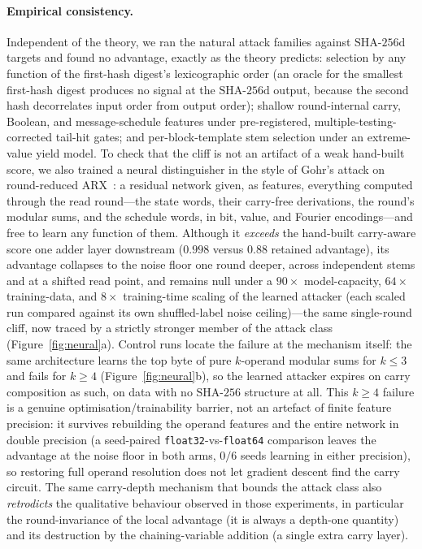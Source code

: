\documentclass[11pt]{article}
\theoremstyle{remark}
\newcommand{\SHA}{\mathrm{SHA\text{-}256}}
\newcommand{\SHAd}{\mathrm{SHA\text{-}256d}}
\begin{document}
\paragraph{Empirical consistency.}
Independent of the theory, we ran the natural attack families against
$\SHAd$ targets and found no advantage, exactly as the theory predicts:
selection by any function of the first-hash digest's lexicographic order
(an oracle for the smallest first-hash digest produces no signal at the
$\SHAd$ output, because the second hash decorrelates input order from
output order); shallow round-internal carry, Boolean, and
message-schedule features under pre-registered, multiple-testing-corrected
tail-hit gates; and per-block-template stem selection under an
extreme-value yield model. To check that the cliff is not an artifact of a
weak hand-built score, we also trained a neural distinguisher in the style
of Gohr's attack on round-reduced ARX~\cite{gohr}: a residual network
given, as features, everything computed through the read round---the state
words, their carry-free derivations, the round's modular sums, and the
schedule words, in bit, value, and Fourier encodings---and free to learn
any function of them. Although it \emph{exceeds} the hand-built carry-aware
score one adder layer downstream ($0.998$ versus $0.88$ retained
advantage), its advantage collapses to the noise floor one round deeper,
across independent stems and at a shifted read point, and remains null
under a $90\times$ model-capacity, $64\times$ training-data, and $8\times$
training-time scaling of the learned attacker (each scaled run compared
against its own shuffled-label noise ceiling)---the same single-round
cliff, now traced by a strictly stronger member of the attack class
(Figure~\ref{fig:neural}a).
Control runs locate the failure at the mechanism itself: the same
architecture learns the top byte of pure $k$-operand modular sums for
$k\le3$ and fails for $k\ge4$ (Figure~\ref{fig:neural}b), so the learned
attacker expires on carry composition as such, on data with no $\SHA$
structure at all. This $k\ge4$ failure is a genuine
optimisation/trainability barrier, not an artefact of finite feature
precision: it survives rebuilding the operand features and the entire
network in double precision (a seed-paired \texttt{float32}-vs-\texttt{float64}
comparison leaves the advantage at the noise floor in both arms, $0/6$
seeds learning in either precision), so restoring full operand resolution
does not let gradient descent find the carry circuit. The same carry-depth mechanism that bounds the
attack class also \emph{retrodicts} the qualitative behaviour observed in
those experiments, in particular the round-invariance of the local
advantage (it is always a depth-one quantity) and its destruction by the
chaining-variable addition (a single extra carry layer).
\end{document}
